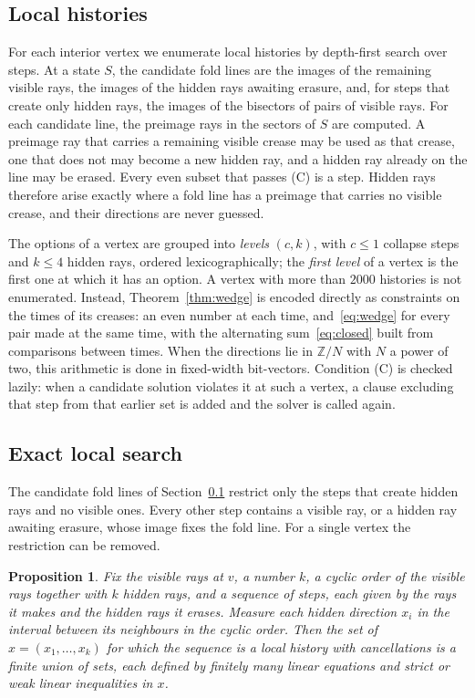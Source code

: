 \documentclass[11pt]{article}
\newtheorem{proposition}[theorem]{Proposition}
\theoremstyle{definition}
\theoremstyle{remark}
\newcommand{\Z}{\mathbb{Z}}
\begin{document}
\subsection{Local histories}\label{sec:local-search}

For each interior vertex we enumerate local histories by depth-first search over steps. At a state $S$, the candidate fold lines are the images of the remaining visible rays, the images of the hidden rays awaiting erasure, and, for steps that create only hidden rays, the images of the bisectors of pairs of visible rays. For each candidate line, the preimage rays in the sectors of $S$ are computed. A preimage ray that carries a remaining visible crease may be used as that crease, one that does not may become a new hidden ray, and a hidden ray already on the line may be erased. Every even subset that passes (C) is a step. Hidden rays therefore arise exactly where a fold line has a preimage that carries no visible crease, and their directions are never guessed.

The options of a vertex are grouped into \emph{levels} $(c,k)$, with $c\le1$ collapse steps and $k\le4$ hidden rays, ordered lexicographically; the \emph{first level} of a vertex is the first one at which it has an option. A vertex with more than $2000$ histories is not enumerated. Instead, Theorem~\ref{thm:wedge} is encoded directly as constraints on the times of its creases: an even number at each time, and~\eqref{eq:wedge} for every pair made at the same time, with the alternating sum~\eqref{eq:closed} built from comparisons between times. When the directions lie in $\Z/N$ with $N$ a power of two, this arithmetic is done in fixed-width bit-vectors. Condition (C) is checked lazily: when a candidate solution violates it at such a vertex, a clause excluding that step from that earlier set is added and the solver is called again.

\subsection{Exact local search}\label{sec:exact}

The candidate fold lines of Section~\ref{sec:local-search} restrict only the steps that create hidden rays and no visible ones. Every other step contains a visible ray, or a hidden ray awaiting erasure, whose image fixes the fold line. For a single vertex the restriction can be removed.

\begin{proposition}\label{prop:linear}
Fix the visible rays at $v$, a number $k$, a cyclic order of the visible rays together with $k$ hidden rays, and a sequence of steps, each given by the rays it makes and the hidden rays it erases. Measure each hidden direction $x_i$ in the interval between its neighbours in the cyclic order. Then the set of $x=(x_1,\dots,x_k)$ for which the sequence is a local history with cancellations is a finite union of sets, each defined by finitely many linear equations and strict or weak linear inequalities in $x$.
\end{proposition}
\end{document}
